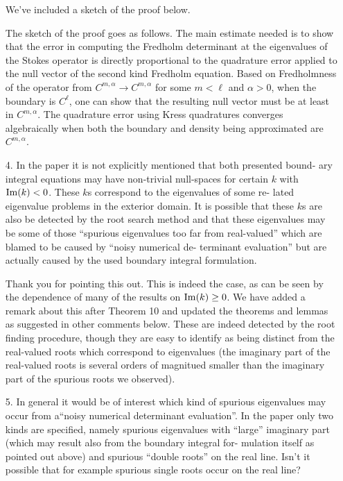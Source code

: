 \documentclass{article}
\begin{document}
\begin{itemize}
We've included a sketch of the proof below. 

The sketch of the proof goes as follows. The main estimate needed is to show that the error in
computing the Fredholm determinant at the eigenvalues of the Stokes operator is directly proportional
to the quadrature error applied to the null vector of the second kind Fredholm equation. 
Based on Fredholmness of the operator from $C^{m,\alpha} \to C^{m,\alpha}$ for some $m<\ell$ and $\alpha>0$, 
when the boundary is $C^{\ell}$, one can show that the resulting null vector must be at least in $C^{m,\alpha}$.
The quadrature error using Kress quadratures converges algebraically when both the boundary and density being
approximated are $C^{m,\alpha}$. 

\item[4.] {\color{blue} In the paper it is not explicitly mentioned that both presented bound-
ary integral equations may have non-trivial null-spaces for certain $k$
with ${\rm Im}(k) < 0$. These $k$s correspond to the eigenvalues of some re-
lated eigenvalue problems in the exterior domain. It is possible that
these $k$s are also be detected by the root search method and that these
eigenvalues may be some of those “spurious eigenvalues too far from
real-valued” which are blamed to be caused by “noisy numerical de-
terminant evaluation” but are actually caused by the used boundary
integral formulation.}

Thank you for pointing this out. This is indeed the case, as can be seen
by the dependence of many of the results on ${\rm Im}(k) \geq 0$. We have
added a remark about this after Theorem 10 and updated the theorems and lemmas
as suggested in other comments below. These are indeed detected by the
root finding procedure, though they are easy to identify as
being distinct from the real-valued roots which correspond to
eigenvalues (the imaginary part of the real-valued roots is several
orders of magnitued smaller than the imaginary part of the
spurious roots we observed).

\item[5.] {\color{blue}
  In general it would be of interest which kind of spurious eigenvalues may
occur from a“noisy numerical determinant evaluation”. In the paper
only two kinds are specified, namely spurious eigenvalues with “large”
imaginary part (which may result also from the boundary integral for-
mulation itself as pointed out above) and spurious “double roots” on
the real line. Isn’t it possible that for example spurious single roots
occur on the real line?}


\end{itemize}
\end{document}
